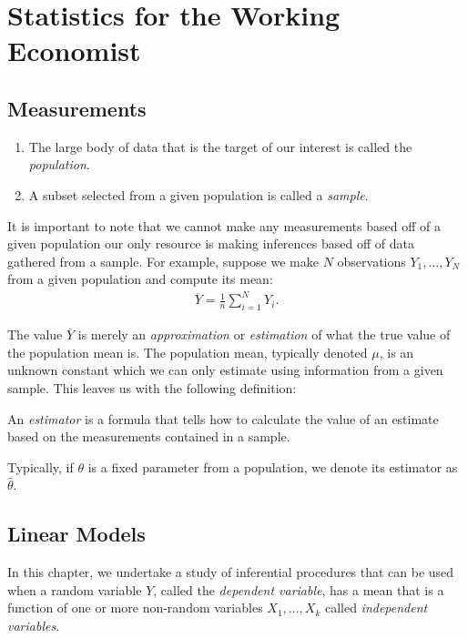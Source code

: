 \chapter{Statistics for the Working Economist}

\section{Measurements}
    \begin{definition}
        \phantom{a}
        \begin{enumerate}[label = (\arabic*),itemsep=1pt,topsep=3pt]
            \item The large body of data that is the target of our interest is called the \textit{population}.
            \item A subset selected from a given population is called a \textit{sample}.
        \end{enumerate}
    \end{definition}
    
    It is important to note that we cannot make any measurements based off of a given population \textemdash our only resource is making inferences based off of data gathered from a sample. For example, suppose we make $N$ observations $Y_1,...,Y_N$ from a given population and compute its mean:
        \begin{equation*}
        \begin{split}
            \overline{Y} = \frac{1}{n} \sum_{i = 1}^N Y_i.
        \end{split}
        \end{equation*}
    
    The value $\overline{Y}$ is merely an \textit{approximation} or \textit{estimation} of what the true value of the population mean is. The population mean, typically denoted $\mu$, is an unknown constant which we can only estimate using information from a given sample. This leaves us with the following definition:
    
    \begin{definition}
        An \textit{estimator} is a formula that tells how to calculate the value of an estimate based on the measurements contained in a sample.
    \end{definition}

    Typically, if $\theta$ is a fixed parameter from a population, we denote its estimator as $\widehat{\theta}$.

\section{Linear Models}
    In this chapter, we undertake a study of inferential procedures that can be used
    when a random variable $Y$, called the \textit{dependent variable}, has a mean that is a function of one or more non-random variables $X_1,...,X_k$ called \textit{independent variables}.

